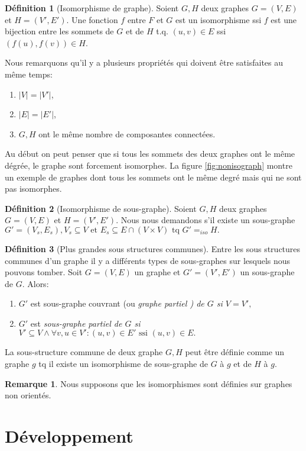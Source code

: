 \documentclass[french]{article}
\theoremstyle{definition}
\newtheorem{deff}{D\'efinition}[section]
\newtheorem{rem}{Remarque}[section]
\theoremstyle{remark}
\begin{document}
\begin{deff}[Isomorphisme de graphe]
Soient $G, H$ deux graphes $G=(V, E)$ et $H=(V', E')$. Une fonction $f$ entre $ F $ et $ G $ est un isomorphisme ssi $ f $ est une bijection entre les sommets de $ G $ et de $ H $ t.q. $ (u,v) \in E$ ssi $ (f(u), f(v)) \in H$.
\end{deff}
Nous remarquons qu'il y a plusieurs propriétés qui doivent être satisfaites au même temps:
 \begin{enumerate}[label=(\roman*)]
 	\item $|V|=|V'|$,
 	\item $|E|=|E'|$,
 	\item $G, H$ ont le même nombre de composantes connectées.
 \end{enumerate}
Au début on peut penser que si tous les sommets des deux graphes ont le même dégrée, le graphe sont forcement isomorphes. 
La figure \ref{fig:nonisograph} montre un exemple de graphes dont tous les sommets ont le même degré mais qui ne sont pas isomorphes.
\begin{deff}[Isomorphisme de sous-graphe]
Soient $G, H$ deux graphes $G=(V, E)$ et $H=(V', E')$. Nous nous demandons s'il existe un sous-graphe $ G'=(V_s, E_s), V_s \subseteq V \text{ et } E_s \subseteq E \cap (V \times V) \text{ tq } G' =_{iso} H. $
\end{deff}
\begin{deff}[Plus grandes sous structures communes]
Entre les sous structures communes d'un graphe il y a différents types de sous-graphes sur lesquels nous pouvons tomber. Soit $G=(V,E)$ un graphe et $G'=(V',E')$ un sous-graphe de $G$. Alors:
\begin{enumerate}
	\item $G'$ est sous-graphe couvrant (ou \it graphe partiel \rm) de $G$ si $V=V',$
	\item $G'$ est \it sous-graphe partiel \rm de $G$ si $V' \subseteq V \land \forall v,u \in V' : (u,v) \in E'  \text{ ssi } (u,v) \in E.$ 
\end{enumerate}
La sous-structure commune de deux graphe $G, H$ peut être définie comme un graphe $g$ tq il existe un isomorphisme de sous-graphe de $G$ à $g$ et de $H$ à $g$.
\end{deff}
\begin{rem}
	Nous supposons que les isomorphismes sont définies sur graphes non orientés.
\end{rem}

\newpage
\section{Développement}
\label{sec:Développement}
\end{document}
